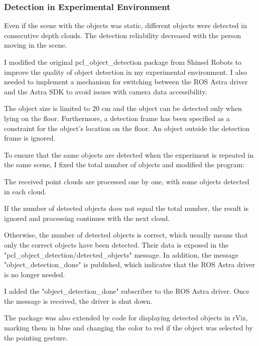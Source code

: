 \subsubsection{Detection in Experimental Environment}
Even if the scene with the objects was static, different objects were detected in consecutive depth clouds. The detection reliability decreased with the person moving in the scene.\par
I modified the original pcl\_object\_detection package from Shinsel Robots to improve the quality of object detection in my experimental environment. I also needed to implement a mechanism for switching between the ROS Astra driver and the Astra SDK to avoid issues with camera data accessibility.\par
The object size is limited to 20 cm and the object can be detected only when lying on the floor. Furthermore, a detection frame has been specified as a constraint for the object's location on the floor. An object outside the detection frame is ignored.\par
To ensure that the same objects are detected when the experiment is repeated in the same scene, I fixed the total number of objects and modified the program:\par
The received point clouds are processed one by one, with some objects detected in each cloud. \par
If the number of detected objects does not equal the total number, the result is ignored and processing continues with the next cloud.\par
Otherwise, the number of detected objects is correct, which usually means that only the correct objects have been detected. Their data is exposed in the "pcl\_object\_detection/detected\_objects" message. In addition, the message "object\_detection\_done" is published, which indicates that the ROS Astra driver is no longer needed.\par 
I added the "object\_detection\_done" subscriber to the ROS Astra driver. Once the message is received, the driver is shut down.\par

The package was also extended by code for displaying detected objects in rViz, marking them in blue and changing the color to red if the object was selected by the  pointing gesture.\par

